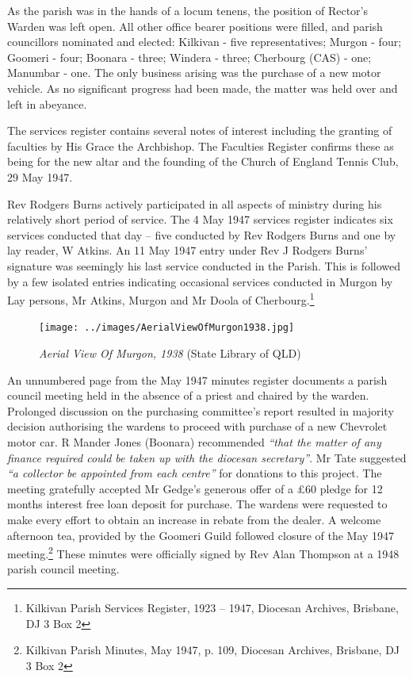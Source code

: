 As the parish was in the hands of a locum tenens, the position of Rector's Warden was left open. All other office bearer positions were filled, and parish councillors nominated and elected: Kilkivan - five representatives; Murgon - four; Goomeri - four; Boonara - three; Windera - three; Cherbourg (CAS) - one; Manumbar - one. The only business arising was the purchase of a new motor vehicle. As no significant progress had been made, the matter was held over and left in abeyance.



The services register contains several notes of interest including the granting of faculties by His Grace the Archbishop. The Faculties Register confirms these as being for the new altar and the founding of the Church of England Tennis Club, 29 May 1947.



Rev Rodgers Burns actively participated in all aspects of ministry during his relatively short period of service. The 4 May 1947 services register indicates six services conducted that day -- five conducted by Rev Rodgers Burns and one by lay reader, W Atkins. An 11 May 1947 entry under Rev J Rodgers Burns' signature was seemingly his last service conducted in the Parish. This is followed by a few isolated entries indicating occasional services conducted in Murgon by Lay persons, Mr Atkins, Murgon and Mr Doola of Cherbourg.\footnote{Kilkivan Parish Services Register, 1923 -- 1947, Diocesan Archives, Brisbane, DJ 3 Box 2}








\begin{figure}[htb]
\begin{center}
\texttt{[image: ../images/AerialViewOfMurgon1938.jpg]}
\caption{{\itshape Aerial View Of Murgon, 1938} {\scriptsize(State Library of QLD)}}
\end{center}
\end{figure}




An unnumbered page from the May 1947 minutes register documents a parish council meeting held in the absence of a priest and chaired by the warden. Prolonged discussion on the purchasing committee's report resulted in majority decision authorising the wardens to proceed with purchase of a new Chevrolet motor car. R Mander Jones (Boonara) recommended \emph{``that the matter of any finance required could be taken up with the diocesan secretary''}. Mr Tate suggested \emph{``a collector be appointed from each centre''} for donations to this project. The meeting gratefully accepted Mr Gedge's generous offer of a \pounds60 pledge for 12 months interest free loan deposit for purchase. The wardens were requested to make every effort to obtain an increase in rebate from the dealer. A welcome afternoon tea, provided by the Goomeri Guild followed closure of the May 1947 meeting.\footnote{Kilkivan Parish Minutes, May 1947, p. 109, Diocesan Archives, Brisbane, DJ 3 Box 2} These minutes were officially signed by Rev Alan Thompson at a 1948 parish council meeting.


